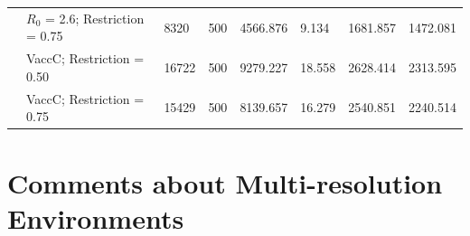 \begin{table}[ht]
\begin{tabular}{@{}clllllll@{}}
                                                                                                                       & $R_0$ = 2.6; Restriction = 0.75      & 8320                                                                         & 500                                                                            & 4566.876                                                                       & 9.134                                                                            & 1681.857                                                                                & 1472.081                                                                                 \\
                                                                                                                       & VaccC; Restriction = 0.50         & 16722                                                                        & 500                                                                            & 9279.227                                                                       & 18.558                                                                           & 2628.414                                                                                & 2313.595                                                                                 \\
                                                                                                                       & VaccC; Restriction = 0.75         & 15429                                                                        & 500                                                                            & 8139.657                                                                       & 16.279                                                                           & 2540.851                                                                                & 2240.514                                                                                 \\ \bottomrule
\end{tabular}
\end{table}

\section{Comments about Multi-resolution Environments}
\label{sec:comments}


